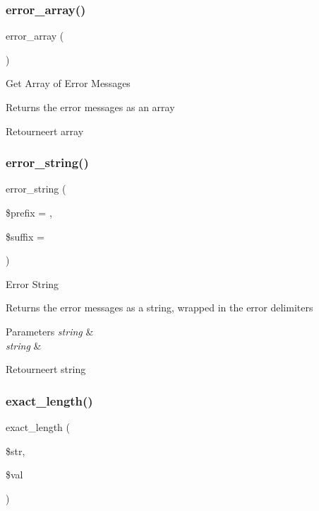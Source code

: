 \subsubsection{\texorpdfstring{error\_array()}{error\_array()}}
{\footnotesize\ttfamily error\+\_\+array (\begin{DoxyParamCaption}{ }\end{DoxyParamCaption})}

Get Array of Error Messages

Returns the error messages as an array

\begin{DoxyReturn}{Retourneert}
array 
\end{DoxyReturn}
\mbox{\label{class_c_i___form__validation_a63271bfb23c2963bed80f44fe9c27b09}} 
\subsubsection{\texorpdfstring{error\_string()}{error\_string()}}
{\footnotesize\ttfamily error\+\_\+string (\begin{DoxyParamCaption}\item[{}]{\$prefix = {\ttfamily \textquotesingle{}\textquotesingle{}},  }\item[{}]{\$suffix = {\ttfamily \textquotesingle{}\textquotesingle{}} }\end{DoxyParamCaption})}

Error String

Returns the error messages as a string, wrapped in the error delimiters


\begin{DoxyParams}{Parameters}
{\em string} & \\
\hline
{\em string} & \\
\hline
\end{DoxyParams}
\begin{DoxyReturn}{Retourneert}
string 
\end{DoxyReturn}
\mbox{\label{class_c_i___form__validation_a126edde2bb0ce82d7a202e340a61de9e}} 
\subsubsection{\texorpdfstring{exact\_length()}{exact\_length()}}
{\footnotesize\ttfamily exact\+\_\+length (\begin{DoxyParamCaption}\item[{}]{\$str,  }\item[{}]{\$val }\end{DoxyParamCaption})}

